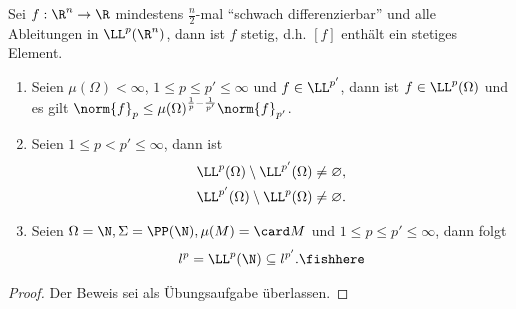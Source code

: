 \begin{prop}
\label{prop:3.71}
Sei $f: \R^n\to\R$ mindestens $\frac{n}{2}$-mal ``schwach differenzierbar'' und
alle  Ableitungen in $\LL^p(\R^n)$, dann ist $f$ stetig, d.h. $[f]$ enthält ein
stetiges Element.\fishhere
\end{prop}

\begin{prop}
\label{prop:3.72}
\begin{enumerate}[label=\arabic{*}.)]
  \item Seien $\mu(\Omega)<\infty$, $1\le p\le p'\le\infty$ und $f\in
  \LL^{p'}$, dann ist $f\in\LL^p(\Omega)$ und es gilt $\norm{f}_p\le
  \mu(\Omega)^{\frac{1}{p}-\frac{1}{p'}}\norm{f}_{p'}$.
  \item Seien $1\le p< p'\le \infty$, dann ist
\begin{align*}
&\LL^p(\Omega)\setminus \LL^{p'}(\Omega) \neq \varnothing,\\
&\LL^{p'}(\Omega)\setminus \LL^p(\Omega)\neq\varnothing.
\end{align*}
\item Seien $\Omega = \N, \Sigma=\PP(\N), \mu(M) = \card M$ und $1\le p\le p'\le
\infty$, dann folgt
\begin{align*}
l^p = \LL^p(\N)\subseteq l^{p'}.\fishhere
\end{align*}
\end{enumerate}
\end{prop}

\begin{proof}
Der Beweis sei als Übungsaufgabe überlassen.\qedhere
\end{proof}


